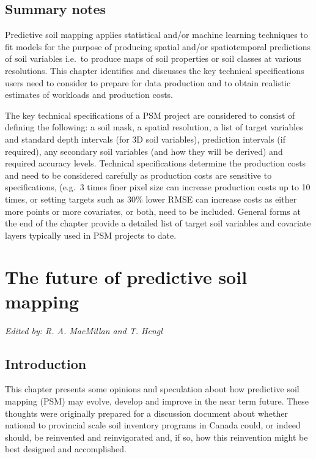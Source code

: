 \documentclass[graybox,natbib,nospthms,UStrade]{svmono}
\begin{document}
\hypertarget{summary-notes}{%
\section{Summary notes}\label{summary-notes}}

Predictive soil mapping applies statistical and/or machine learning
techniques to fit models for the purpose of producing spatial and/or
spatiotemporal predictions of soil variables i.e.~to produce maps of
soil properties or soil classes at various resolutions. This chapter
identifies and discusses the key technical specifications users need to
consider to prepare for data production and to obtain realistic
estimates of workloads and production costs.

The key technical specifications of a PSM project are considered to consist of defining
the following: a soil mask, a spatial resolution, a list of target
variables and standard depth intervals (for 3D soil variables),
prediction intervals (if required), any secondary soil variables (and
how they will be derived) and required accuracy levels. Technical
specifications determine the production costs and need to be considered
carefully as production costs are sensitive to specifications, (e.g.~3
times finer pixel size can increase production costs up to 10 times, or
setting targets such as 30\% lower RMSE can increase costs as either more
points or more covariates, or both, need to be included. General forms
at the end of the chapter provide a detailed list of target soil
variables and covariate layers typically used in PSM projects to date.

\hypertarget{the-future-of-predictive-soil-mapping}{%
\chapter{The future of predictive soil mapping}\label{the-future-of-predictive-soil-mapping}}

\emph{Edited by: R. A. MacMillan and T. Hengl}

\hypertarget{introduction-3}{%
\section{Introduction}\label{introduction-3}}

This chapter presents some opinions and speculation about how predictive
soil mapping (PSM) may evolve, develop and improve in the near term
future. These thoughts were originally prepared for a discussion document about
whether national to provincial scale soil inventory programs in Canada
could, or indeed should, be reinvented and reinvigorated and, if so, how
this reinvention might be best designed and accomplished.
\end{document}
